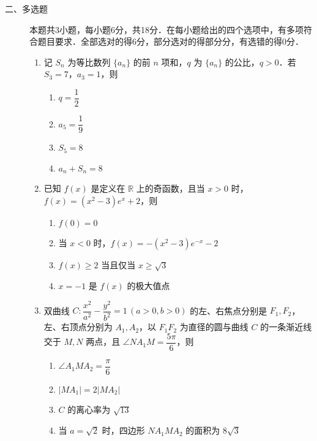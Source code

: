 \begin{description}
    \item[二、多选题] 本题共3小题，每小题6分，共18分．在每小题给出的四个选项中，有多项符合题目要求．全部选对的得6分，部分选对的得部分分，有选错的得0分．
    \begin{enumerate}[leftmargin=5pt]
      \addtocounter{enumi}{+8}
        \item 记 $S_n$ 为等比数列 $\{a_n\}$ 的前 $n$ 项和，$q$ 为 $\{a_n\}$ 的公比，$q>0$．若 $S_3=7$，$a_3=1$，则
        \begin{enumerate}[label=\Alph*.]
            \item $q=\dfrac{1}{2}$
            \item $a_5=\dfrac{1}{9}$
            \item $S_5=8$
            \item $a_n+S_n=8$
        \end{enumerate}

        \item 已知 $f(x)$ 是定义在 $\mathbb{R}$ 上的奇函数，且当 $x>0$ 时，$f(x)=(x^2-3)e^x+2$，则
        \begin{enumerate}[label=\Alph*.]
            \item $f(0)=0$
            \item 当 $x<0$ 时，$f(x)=-(x^2-3)e^{-x}-2$
            \item $f(x)\geqslant2$ 当且仅当 $x\geqslant\sqrt{3}$
            \item $x=-1$ 是 $f(x)$ 的极大值点
        \end{enumerate}

        \item 双曲线 $C:\dfrac{x^2}{a^2}-\dfrac{y^2}{b^2}=1\,(a>0,b>0)$ 的左、右焦点分别是 $F_1,F_2$，左、右顶点分别为 $A_1,A_2$，以 $F_1F_2$ 为直径的圆与曲线 $C$ 的一条渐近线交于 $M,N$ 两点，且 $\angle NA_1M=\dfrac{5\pi}{6}$，则
        \begin{enumerate}[label=\Alph*.]
            \item $\angle A_1MA_2=\dfrac{\pi}{6}$
            \item $|MA_1|=2|MA_2|$
            \item $C$ 的离心率为 $\sqrt{13}$
            \item 当 $a=\sqrt{2}$ 时，四边形 $NA_1MA_2$ 的面积为 $8\sqrt{3}$
        \end{enumerate}
    \end{enumerate}
\end{description}

